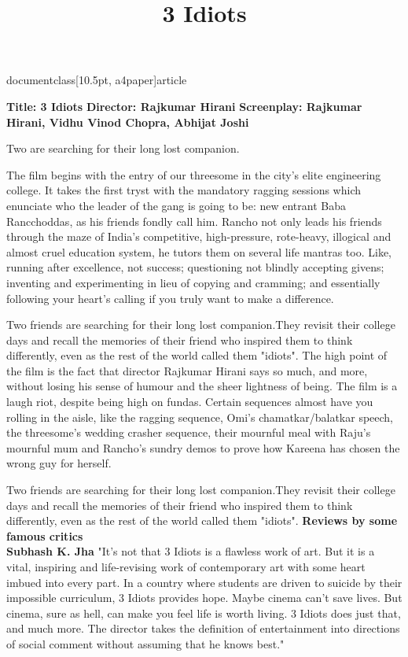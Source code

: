 documentclass[10.5pt, a4paper]{article}
\usepackage{amsfonts}
\usepackage[top=0.3in,left=0.2in,right=0.2in]{geometry}
\usepackage{times}
\usepackage{tabularx}
\title{3 Idiots}

\maketitle
\textbf{Title: 3 Idiots}
\textbf{Director: Rajkumar Hirani}
\textbf{Screenplay: Rajkumar Hirani, Vidhu Vinod Chopra, Abhijat Joshi}

Two  are searching for their long lost companion.

The film begins with the entry of our threesome in the city's elite engineering college.
 It takes the first tryst with the mandatory ragging sessions which enunciate who the leader
 of the gang is going to be: new entrant Baba Rancchoddas, as his friends fondly call him. Rancho not only leads
 his friends through the maze of India's competitive, high-pressure, rote-heavy, illogical and almost cruel
 education system, he tutors them on several life mantras too. Like, running after excellence, not success;
 questioning not blindly accepting givens; inventing and experimenting in lieu of copying and cramming;
 and essentially following your heart's calling if you truly want to make
 a difference.

Two friends are searching for their long lost companion.They revisit their college days 
and recall the memories of their friend who inspired them to think differently, 
even as the rest of the world called them "idiots". 
The high point of the film is the fact that director Rajkumar Hirani says so much, and more, without losing his sense of humour and the sheer lightness of being. The film is a laugh riot, despite being high on fundas. Certain sequences almost have you rolling in the aisle, like the ragging sequence, Omi's chamatkar/balatkar speech, the threesome's wedding crasher sequence, their mournful meal with Raju's mournful mum and Rancho's sundry demos to prove how Kareena has chosen the wrong guy for herself.

Two friends are searching for their long lost companion.They revisit their college days 
and recall the memories of their friend who inspired them to think differently, 
even as the rest of the world called them "idiots". 
\textbf{Reviews by some famous critics}\\
\textbf{Subhash K. Jha }
"It's not that 3 Idiots is a flawless work of art. But it is a vital, inspiring and life-revising work of contemporary art with some heart imbued into every part. In a country where students are driven to suicide by their impossible curriculum, 3 Idiots provides hope. Maybe cinema can't save lives. But cinema, sure as hell, can make you feel life is worth living. 3 Idiots does just that, and much more. The director takes the definition of entertainment into directions of social comment without assuming that he knows best."


